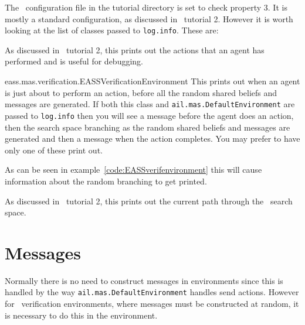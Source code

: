 The \jpf\ configuration file in the tutorial directory is set to check property 3.  It is mostly a standard configuration, as discussed in \ajpf\ tutorial 2.  However it is worth looking at the list of classes passed to \texttt{log.info}.  These are:
\begin{description}
\item[ail.mas.DefaultEnvironment] As discussed in \ajpf\ tutorial 2, this prints out the actions that an agent has performed and is useful for debugging.
\begin{sloppypar}
\item[eass.mas.verification.EASSVerificationEnvironment] This prints out when an agent is just about to perform an action, before all the random shared beliefs and messages are generated.  If both this class and \texttt{ail.mas.DefaultEnvironment} are passed to \texttt{log.info} then you will see a message before the agent does an action, then the search space branching as the random shared beliefs and messages are generated and then a message when the action completes.  You may prefer to have only one of these print out.
\end{sloppypar}
\item[eass.tutorials.tutorial3.VerificationEnvironment] As can be seen in example~\ref{code:EASSverifenvironment} this will cause information about the random branching to get printed.
\item[ajpf.product.Product] As discussed in \ajpf\ tutorial 2, this prints out the current path through the \ajpf\ search space.
\end{description}

\section{Messages}
Normally there is no need to construct messages in environments since this is handled by the way \texttt{ail.mas.DefaultEnvironment} handles send actions.  However for \eass\ verification environments, where messages must be constructed at random, it is necessary to do this in the environment.


